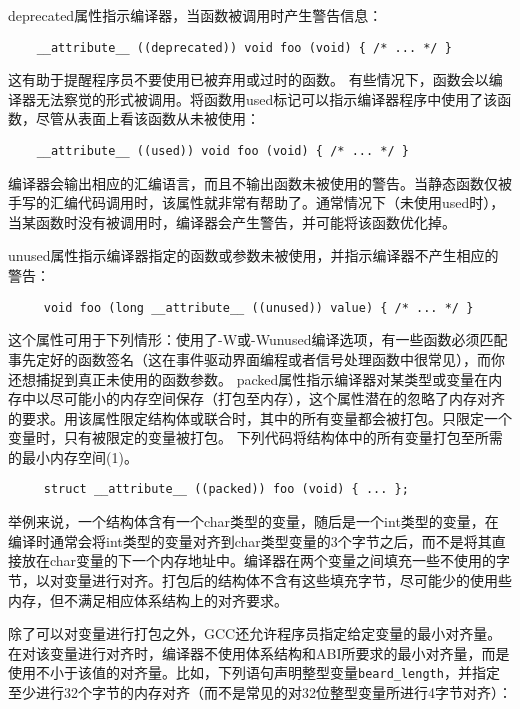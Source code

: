 deprecated属性指示编译器，当函数被调用时产生警告信息：
\begin{lstlisting}
    __attribute__ ((deprecated)) void foo (void) { /* ... */ }
\end{lstlisting}
这有助于提醒程序员不要使用已被弃用或过时的函数。
有些情况下，函数会以编译器无法察觉的形式被调用。将函数用used标记可以指示编译器程序中使用了该函数，尽管从表面上看该函数从未被使用：
\begin{lstlisting}
    __attribute__ ((used)) void foo (void) { /* ... */ }
\end{lstlisting}
编译器会输出相应的汇编语言，而且不输出函数未被使用的警告。当静态函数仅被手写的汇编代码调用时，该属性就非常有帮助了。通常情况下（未使用used时），当某函数时没有被调用时，编译器会产生警告，并可能将该函数优化掉。

unused属性指示编译器指定的函数或参数未被使用，并指示编译器不产生相应的警告：
\begin{lstlisting}
     void foo (long __attribute__ ((unused)) value) { /* ... */ }
\end{lstlisting}
这个属性可用于下列情形：使用了-W或-Wunused编译选项，有一些函数必须匹配事先定好的函数签名（这在事件驱动界面编程或者信号处理函数中很常见），而你还想捕捉到真正未使用的函数参数。
packed属性指示编译器对某类型或变量在内存中以尽可能小的内存空间保存（打包至内存），这个属性潜在的忽略了内存对齐的要求。用该属性限定结构体或联合时，其中的所有变量都会被打包。只限定一个变量时，只有被限定的变量被打包。
下列代码将结构体中的所有变量打包至所需的最小内存空间(1)。
\begin{lstlisting}
     struct __attribute__ ((packed)) foo (void) { ... };
\end{lstlisting}
举例来说，一个结构体含有一个char类型的变量，随后是一个int类型的变量，在编译时通常会将int类型的变量对齐到char类型变量的3个字节之后，而不是将其直接放在char变量的下一个内存地址中。编译器在两个变量之间填充一些不使用的字节，以对变量进行对齐。打包后的结构体不含有这些填充字节，尽可能少的使用些内存，但不满足相应体系结构上的对齐要求。

除了可以对变量进行打包之外，GCC还允许程序员指定给定变量的最小对齐量。在对该变量进行对齐时，编译器不使用体系结构和ABI所要求的最小对齐量，而是使用不小于该值的对齐量。比如，下列语句声明整型变量\verb+beard_length+，并指定至少进行32个字节的内存对齐（而不是常见的对32位整型变量所进行4字节对齐）：


